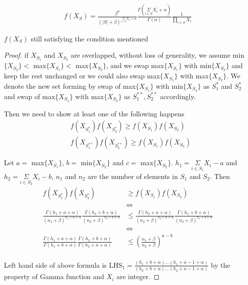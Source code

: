 \documentclass[aoas,preprint]{imsart}
\begin{document}
\begin{eqnarray*}
f(X_{S}) = \frac{\beta^\alpha}{(|S| + \beta)^{\underset{i \in S}{\Sigma} X_i + \alpha}} \frac{\Gamma(\underset{i \in S}{\Sigma} X_i  + \alpha)}{\Gamma(\alpha)} \frac{1}{\underset{i \in S}{\prod }X_i}
\end{eqnarray*}

$f(X_S)$ still satisfying the condition mentioned



\begin{proof}
if $X_{S_1}$ and $X_{S_2}$ are overlapped, without loss of generality, we assume min$\{X_{S_2}\}  <$ max$\{X_{S_1}\}  <$ max$\{X_{S_2}\}$, and we swap max$\{X_{S_1}\}$ with min$\{X_{S_2}\}$ and keep the rest unchanged or we could also swap max$\{X_{S_1}\}$ with max$\{X_{S_2}\}$. We denote the new set forming by swap of max$\{X_{S_1}\}$ with min$\{X_{S_2}\}$  as $S_1^*$ and $S_2^*$ and swap of max$\{X_{S_1}\}$ with max$\{X_{S_2}\}$ as $S_1^{**}, S_2^{**}$ accordingly.

Then we need to show  at least one of the following happens
\begin{align}
&f(X_{S_1^*}) f(X_{S_2^*}) \geq f(X_{S_1}) f(X_{S_2})\\
&f(X_{S_1^{**}}) f(X_{S_2^{**}}) \geq f(X_{S_1}) f(X_{S_2})
\end{align}


Let $a =$ max$\{X_{S_1}\}$, $b = $ min$\{X_{S_2}\}$ and $c = $ max$\{X_{S_2}\}$. $h_1 = \underset{i \in S_1}{\Sigma} X_i - a$ and $h_2 = \underset{i \in S_2}{\Sigma} X_i - b$, $n_1$ and $n_2$ are the number of elements in $S_1$ and $S_2$. Then
\begin{align*}
f(X_{S_1^*}) f(X_{S_2^*}) &\geq f(X_{S_1}) f(X_{S_2})\\
&\iff\\
\frac{\Gamma(h_1 + a + \alpha)}{(n_1 + \beta)^{h_1 + a +\alpha}} \frac{\Gamma(h_2 + b + \alpha)}{(n_2 + \beta)^{h_2 + b + \alpha}} &\leq \frac{\Gamma(h_2 + a + \alpha)}{(n_2 + \beta)^{h_2+ a +\alpha}} \frac{\Gamma(h_1 + b + \alpha)}{(n_2 + \beta)^{h_1 + b + \alpha}}\\
&\iff\\
\frac{\Gamma(h_1 + a + \alpha)}{\Gamma(h_1 + b + \alpha)} \frac{\Gamma(h_2 + b + \alpha)}{\Gamma(h_2 + a + \alpha)} &\leq (\frac{n_1 + \beta}{n_2 + \beta})^{a - b} \\
\end{align*}


Left hand side of above formula is $\text{LHS}_1 = \frac{(h_1 + b + \alpha)...(h_1 + a - 1 + \alpha)}{(h_2 + b + \alpha) ... (h_2 + a - 1 + \alpha)}$ by the property of Gamma function and $X_i$ are integer.


\end{proof}
\end{document}
